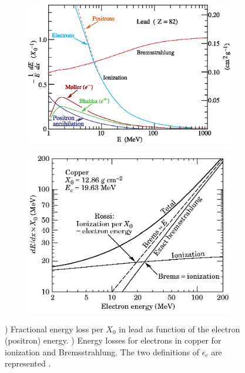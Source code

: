 \begin{figure}[htbp!]
  \centering
  \begin{subfigure}[t]{0.49\textwidth}
    \includegraphics[width=1.\linewidth]{chap2/fig/elossfrac_06.eps}
    \caption{} \label{fig:ElossEM}
  \end{subfigure}
  \hfill
  \begin{subfigure}[t]{0.49\textwidth}
    \includegraphics[width=1.\linewidth]{chap2/fig/encrit_cu.eps}
    \caption{} \label{fig:Ec}
  \end{subfigure}
  \caption{) Fractional energy loss per $X_0$ in lead as function of the electron (positron) energy. ) Energy losses for electrons in copper for ionization and Bremsstrahlung. The two definitions of $\epsilon_{c}$ are represented \cite{Patrignani:2016xqp}.}
\end{figure}

